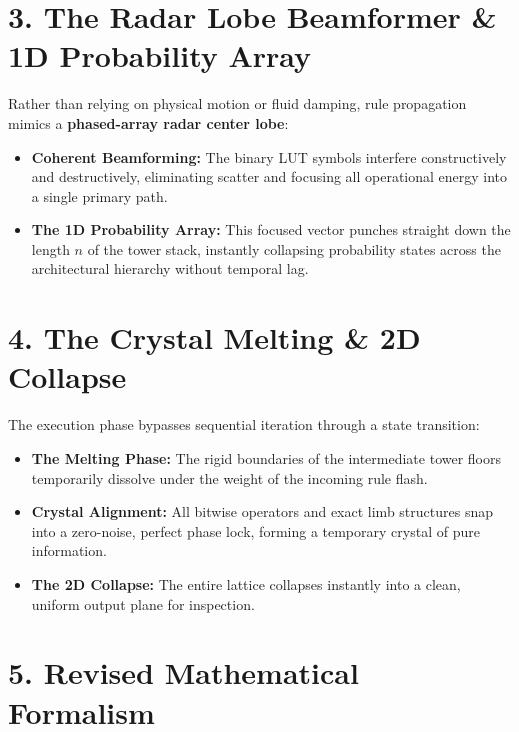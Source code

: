 \medskip

\section{\texorpdfstring{3. The Radar Lobe Beamformer \& 1D Probability Array}{3. The Radar Lobe Beamformer \& 1D Probability Array}}

Rather than relying on physical motion or fluid damping, rule propagation mimics a \textbf{phased-array radar center lobe}:

\begin{itemize}
\item \textbf{Coherent Beamforming:} The binary LUT symbols interfere constructively and destructively, eliminating scatter and focusing all operational energy into a single primary path.
\item \textbf{The 1D Probability Array:} This focused vector punches straight down the length \(n\) of the tower stack, instantly collapsing probability states across the architectural hierarchy without temporal lag.
\end{itemize}

\medskip

\section{\texorpdfstring{4. The Crystal Melting \& 2D Collapse}{4. The Crystal Melting \& 2D Collapse}}

The execution phase bypasses sequential iteration through a state transition:

\begin{itemize}
\item \textbf{The Melting Phase:} The rigid boundaries of the intermediate tower floors temporarily dissolve under the weight of the incoming rule flash.
\item \textbf{Crystal Alignment:} All bitwise operators and exact limb structures snap into a zero-noise, perfect phase lock, forming a temporary crystal of pure information.
\item \textbf{The 2D Collapse:} The entire lattice collapses instantly into a clean, uniform output plane for inspection.
\end{itemize}

\medskip

\section{\texorpdfstring{5. Revised Mathematical Formalism}{5. Revised Mathematical Formalism}}

